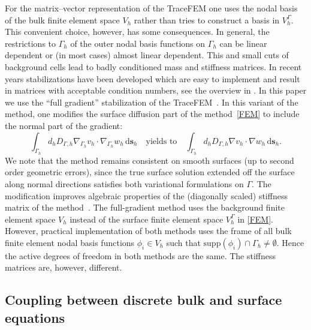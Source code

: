 \documentclass{article}
\def\ds{\mathrm{d}\mathbf{s}}
\def\nath{\nabla_{\Gamma_h}}
\begin{document}
For the matrix--vector representation of the TraceFEM one uses the nodal basis of the bulk finite element space $V_h$ rather than tries to construct a basis in $V_h^{\Gamma}$.  This convenient choice, however, has some consequences. In general, the restrictions to $\Gamma_h$ of the outer nodal basis functions on $\Gamma_h$ can be linear dependent or (in most cases) almost linear dependent.
This and small cuts of background cells lead to badly conditioned mass and stiffness matrices. In recent
years stabilizations have been developed which are easy to implement and result in
matrices with acceptable condition numbers, see the overview in \cite{TraceFEM}.
In this paper we use the ``full gradient'' stabilization of the TraceFEM~\cite{Alg2,Reusken2014}. In this variant of the method, one modifies the surface diffusion part of the  method~\eqref{FEM} to include the normal part of the gradient:
\[
\int_{\Gamma_h}d_h D_{\Gamma,h}\nath v_h\cdot\nath w_h\,\ds_h\quad\text{yields to}\quad
\int_{\Gamma_h}d_h D_{\Gamma,h}\nabla v_h\cdot\nabla w_h\,\ds_h.
\]
We note that the method remains consistent on smooth surfaces (up to second order geometric errors), since the true surface solution extended off the surface along normal directions satisfies both variational formulations on $\Gamma$.   The modification improves algebraic properties of the (diagonally scaled) stiffness matrix of the method~\cite{Reusken2014}. The full-gradient method  uses the background finite element space $V_h$ instead of the surface finite element space $V_h^\Gamma$ in \eqref{FEM}. However, practical implementation of both methods uses the frame of all bulk finite element nodal basis functions $\phi_i\in V_h$ such that  $\mbox{supp}(\phi_i)\cap\Gamma_h\neq\emptyset$. Hence the active degrees of freedom  in both methods are the same. The stiffness matrices are, however, different.


\subsection{Coupling between discrete bulk and surface equations}\label{s3}
\end{document}
